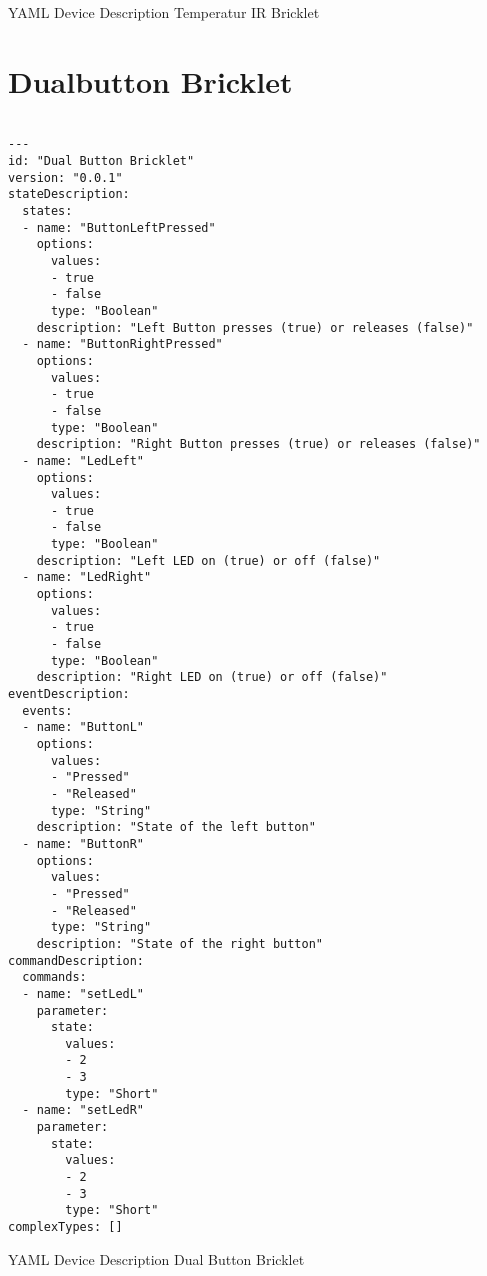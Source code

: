 \begin{listing}[H]
\caption{YAML Device Description Temperatur IR Bricklet}
\end{listing}


\section{Dualbutton Bricklet}

\begin{verbatim}

---
id: "Dual Button Bricklet"
version: "0.0.1"
stateDescription:
  states:
  - name: "ButtonLeftPressed"
    options:
      values:
      - true
      - false
      type: "Boolean"
    description: "Left Button presses (true) or releases (false)"
  - name: "ButtonRightPressed"
    options:
      values:
      - true
      - false
      type: "Boolean"
    description: "Right Button presses (true) or releases (false)"
  - name: "LedLeft"
    options:
      values:
      - true
      - false
      type: "Boolean"
    description: "Left LED on (true) or off (false)"
  - name: "LedRight"
    options:
      values:
      - true
      - false
      type: "Boolean"
    description: "Right LED on (true) or off (false)"
eventDescription:
  events:
  - name: "ButtonL"
    options:
      values:
      - "Pressed"
      - "Released"
      type: "String"
    description: "State of the left button"
  - name: "ButtonR"
    options:
      values:
      - "Pressed"
      - "Released"
      type: "String"
    description: "State of the right button"
commandDescription:
  commands:
  - name: "setLedL"
    parameter:
      state:
        values:
        - 2
        - 3
        type: "Short"
  - name: "setLedR"
    parameter:
      state:
        values:
        - 2
        - 3
        type: "Short"
complexTypes: []

\end{verbatim}
\begin{listing}[H]
\caption{YAML Device Description Dual Button Bricklet}
\end{listing}